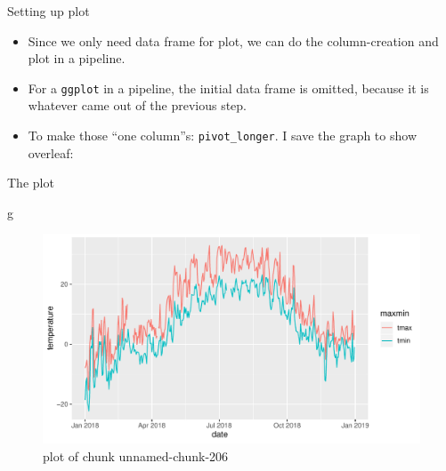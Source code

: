 \documentclass[ignorenonframetext,]{beamer}
\newenvironment{Shaded}{\begin{snugshade}}{\end{snugshade}}
\newcommand{\DataTypeTok}[1]{\textcolor[rgb]{0.13,0.29,0.53}{#1}}
\newcommand{\KeywordTok}[1]{\textcolor[rgb]{0.13,0.29,0.53}{\textbf{#1}}}
\newcommand{\NormalTok}[1]{#1}
\newcommand{\OperatorTok}[1]{\textcolor[rgb]{0.81,0.36,0.00}{\textbf{#1}}}
\newcommand{\StringTok}[1]{\textcolor[rgb]{0.31,0.60,0.02}{#1}}
\providecommand{\tightlist}{%
  \setlength{\itemsep}{0pt}\setlength{\parskip}{0pt}}
\begin{document}
\begin{frame}[fragile]{Setting up plot}
\protect\hypertarget{setting-up-plot}{}

\begin{itemize}
\tightlist
\item
  Since we only need data frame for plot, we can do the column-creation
  and plot in a pipeline.
\item
  For a \texttt{ggplot} in a pipeline, the initial data frame is
  omitted, because it is whatever came out of the previous step.
\item
  To make those ``one column''s: \texttt{pivot\_longer}. I save the
  graph to show overleaf:
\end{itemize}

\begin{Shaded}
\end{Shaded}

\end{frame}

\begin{frame}[fragile]{The plot}
\protect\hypertarget{the-plot}{}

\begin{Shaded}
\begin{Highlighting}[]
\NormalTok{g}
\end{Highlighting}
\end{Shaded}

\begin{figure}
\centering
\includegraphics{figure/unnamed-chunk-206-1.pdf}
\caption{plot of chunk unnamed-chunk-206}
\end{figure}

\end{frame}
\end{document}
